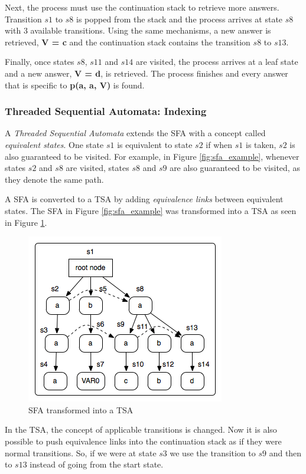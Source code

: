  Next, the process must use the continuation stack to retrieve more answers. Transition $s1$ to $s8$ is popped from the stack
  and the process arrives at state $s8$ with 3 available transitions. Using the same mechanisms, a new answer is retrieved,
  \textbf{V = c} and the continuation stack contains the transition $s8$ to $s13$.
  
  Finally, once states $s8$, $s11$ and $s14$ are visited, the process arrives at a leaf state and a new answer, \textbf{V = d}, is retrieved.
  The process finishes and every answer that is specific to \textbf{p(a, a, V)} is found.
  
  \subsubsection{Threaded Sequential Automata: Indexing}
  
  A \textit{Threaded Sequential Automata} extends the SFA with a concept called
  \textit{equivalent states}. One state $s1$ is equivalent to state $s2$ if when $s1$ is taken, $s2$ is also
  guaranteed to be visited. For example, in Figure \ref{fig:sfa_example}, whenever states $s2$ and $s8$ are
  visited, states $s8$ and $s9$ are also guaranteed to be visited, as they denote the same path.
  
  A SFA is converted to a TSA by adding \textit{equivalence links} between equivalent states.
  The SFA in Figure \ref{fig:sfa_example} was transformed into a TSA as seen in Figure \ref{fig:tsa_example}.
  
  \begin{figure}[ht]
    \centering
      \includegraphics[scale=0.6]{tsa.png}
    \caption{SFA transformed into a TSA}
    \label{fig:tsa_example}
  \end{figure}
  
  In the TSA, the concept of applicable transitions is changed. Now it is also possible to push equivalence links
  into the continuation stack as if they were normal transitions. So, if we were at state $s3$ we use
  the transition to $s9$ and then to $s13$ instead of going from the start state.
  
